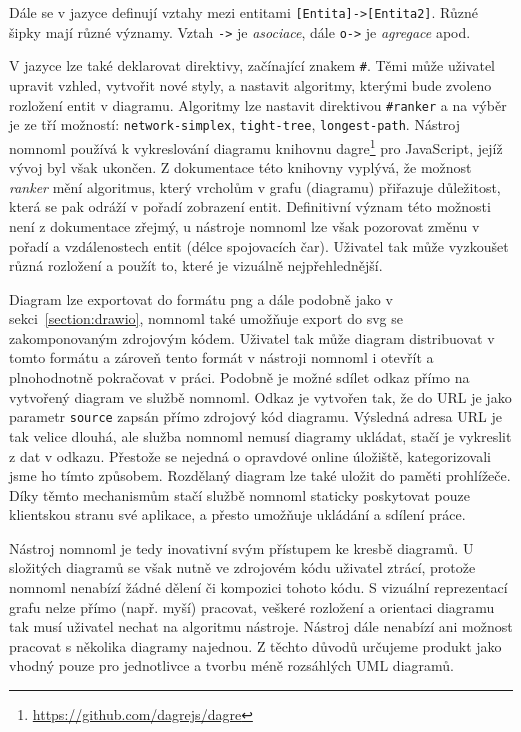 Dále se v jazyce definují vztahy mezi entitami \texttt{[Entita]->[Entita2]}.
Různé šipky mají různé významy.
Vztah \texttt{->} je \emph{asociace}, dále \texttt{o->} je \emph{agregace} apod.

V jazyce lze také deklarovat direktivy, začínající znakem \texttt{\#}.
Těmi může uživatel upravit vzhled, vytvořit nové styly, a nastavit algoritmy, kterými bude zvoleno rozložení entit v diagramu.
Algoritmy lze nastavit direktivou \texttt{\#ranker} a na výběr je ze tří možností: \texttt{network-simplex}, \texttt{tight-tree}, \texttt{longest-path}.
Nástroj nomnoml používá k vykreslování diagramu knihovnu dagre\footnote{\url{https://github.com/dagrejs/dagre}} pro JavaScript, jejíž vývoj byl však ukončen.
Z dokumentace této knihovny vyplývá, že možnost \emph{ranker} mění algoritmus, který vrcholům v grafu (diagramu) přiřazuje důležitost, která se pak odráží v pořadí zobrazení entit.
Definitivní význam této možnosti není z dokumentace zřejmý, u nástroje nomnoml lze však pozorovat změnu v pořadí a vzdálenostech entit (délce spojovacích čar).
Uživatel tak může vyzkoušet různá rozložení a použít to, které je vizuálně nejpřehlednější.

Diagram lze exportovat do formátu \acrshort{png} a dále podobně jako v sekci~\ref{section:drawio}, nomnoml také umožňuje export do \acrshort{svg} se zakomponovaným zdrojovým kódem.
Uživatel tak může diagram distribuovat v tomto formátu a zároveň tento formát v nástroji nomnoml i otevřít a plnohodnotně pokračovat v práci.
Podobně je možné sdílet odkaz přímo na vytvořený diagram ve službě nomnoml.
Odkaz je vytvořen tak, že do URL je jako parametr \texttt{source} zapsán přímo zdrojový kód diagramu.
Výsledná adresa URL je tak velice dlouhá, ale služba nomnoml nemusí diagramy ukládat, stačí je vykreslit z dat v odkazu.
Přestože se nejedná o opravdové online úložiště, kategorizovali jsme ho tímto způsobem.
Rozdělaný diagram lze také uložit do paměti prohlížeče.
Díky těmto mechanismům stačí službě nomnoml staticky poskytovat pouze klientskou stranu své aplikace, a přesto umožňuje ukládání a sdílení práce.

Nástroj nomnoml je tedy inovativní svým přístupem ke kresbě diagramů.
U složitých diagramů se však nutně ve zdrojovém kódu uživatel ztrácí, protože nomnoml nenabízí žádné dělení či kompozici tohoto kódu.
S vizuální reprezentací grafu nelze přímo (např. myší) pracovat, veškeré rozložení a orientaci diagramu tak musí uživatel nechat na algoritmu nástroje.
Nástroj dále nenabízí ani možnost pracovat s několika diagramy najednou.
Z těchto důvodů určujeme produkt jako vhodný pouze pro jednotlivce a tvorbu méně rozsáhlých UML diagramů.

